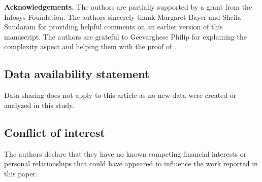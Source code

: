 \documentclass[12pt,reqno]{amsart}
\theoremstyle{definition}
\begin{document}
\begin{itemize}

\end{itemize}

\noindent
{\bf Acknowledgements.} 
The authors are partially supported by a grant from the Infosys Foundation.
The authors sincerely thank Margaret Bayer and Sheila Sundaram  for providing helpful comments on an earlier version of this manuscript. 
The authors are grateful to Geevarghese Philip for explaining the complexity aspect and helping them with the proof of . 

\subsection*{Data availability statement} Data sharing does not apply to this article as no new data were created or analyzed in this study.

 \subsection*{Conflict of interest} The authors declare that they have no known competing financial interests or personal relationships that could have appeared to influence the work reported in this paper.

 \nocite{*}
	
	
	
	
\end{document}
